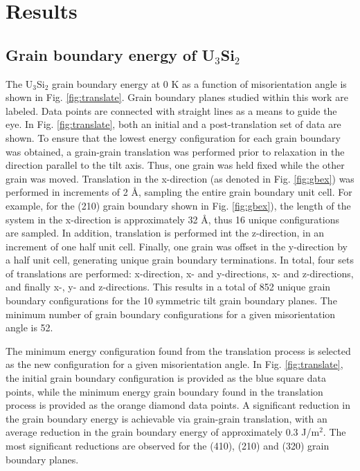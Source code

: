 \documentclass[review]{elsarticle}
\begin{document}
\section{Results}
\subsection{Grain boundary energy of U$_{3}$Si$_{2}$}

The U$_{3}$Si$_{2}$ grain boundary energy at 0 K as a function of misorientation angle is shown in Fig. \ref{fig:translate}. Grain boundary planes studied within this work are labeled. Data points are connected with straight lines as a means to guide the eye. In Fig. \ref{fig:translate}, both an initial and a post-translation set of data are shown. To ensure that the lowest energy configuration for each grain boundary was obtained, a grain-grain translation was performed prior to relaxation in the direction parallel to the tilt axis. Thus, one grain was held fixed while the other grain was moved. Translation in the x-direction (as denoted in Fig. \ref{fig:gbex}) was performed in increments of 2 {\AA}, sampling the entire grain boundary unit cell. For example, for the (210) grain boundary shown in Fig. \ref{fig:gbex}), the length of the system in the x-direction is approximately 32 {\AA}, thus 16 unique configurations are sampled. In addition, translation is performed int the z-direction, in an increment of one half unit cell. Finally, one grain was offset in the y-direction by a half unit cell,  generating unique grain boundary terminations. In total, four sets of translations are performed: x-direction, x- and y-directions, x- and z-directions, and finally x-, y- and z-directions. This results in a total of 852 unique grain boundary configurations for the 10 symmetric tilt grain boundary planes. The minimum number of grain boundary configurations for a given misorientation angle is 52. 

The minimum energy configuration found from the translation process is selected as the new configuration for a given misorientation angle. In Fig. \ref{fig:translate}, the initial grain boundary configuration is provided as the blue square data points, while the minimum energy grain boundary found in the translation process is provided as the orange diamond data points. A significant reduction in the grain boundary energy is achievable via grain-grain translation, with an average reduction in the grain boundary energy of approximately 0.3 J/m$^{2}$. The most significant reductions are observed for the (410), (210) and (320) grain boundary planes. 
\end{document}
